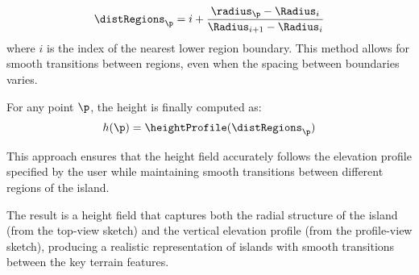 \begin{align}
    \distRegions_\p = i + \frac{\radius_\p - \Radius_{i}}{\Radius_{i + 1} - \Radius_{i}}
\end{align}
where $i$ is the index of the nearest lower region boundary. This method allows for smooth transitions between regions, even when the spacing between boundaries varies. 



For any point $\p$, the height is finally computed as:
\begin{align}
    h(\p) = \heightProfile(\distRegions_\p)
\end{align}

This approach ensures that the height field accurately follows the elevation profile specified by the user while maintaining smooth transitions between different regions of the island.


The result is a height field that captures both the radial structure of the island (from the top-view sketch) and the vertical elevation profile (from the profile-view sketch), producing a realistic representation of islands with smooth transitions between the key terrain features.



